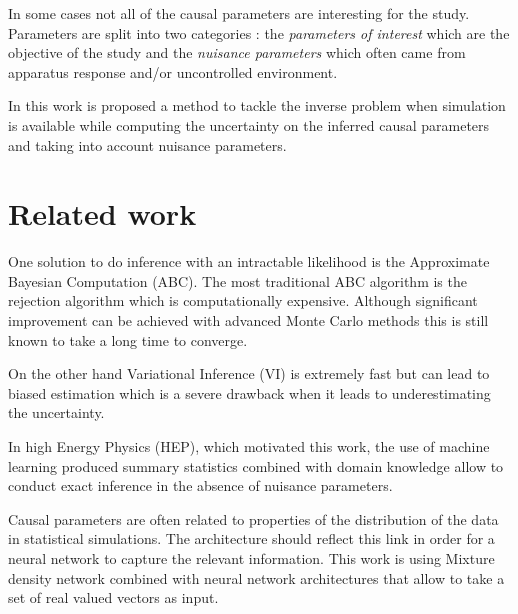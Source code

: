 In some cases not all of the causal parameters are interesting for the study.
Parameters are split into two categories : the \emph{parameters of interest} which are the objective of the study and the \emph{nuisance parameters} which often came from apparatus response and/or uncontrolled environment.

In this work is proposed a method to tackle the inverse problem when simulation is available while computing the uncertainty on the inferred causal parameters and taking into account nuisance parameters.


\section{Related work}



One solution to do inference with an intractable likelihood is the Approximate Bayesian Computation (ABC).
The most traditional ABC algorithm is the rejection algorithm which is computationally expensive.
Although significant improvement can be achieved with advanced Monte Carlo methods this is still known to take a long time to converge.

On the other hand Variational Inference (VI) is extremely fast but can lead to biased estimation which is a severe drawback when it leads to underestimating the uncertainty.

In high Energy Physics (HEP), which motivated this work, the use of machine learning produced summary statistics combined with domain knowledge allow to conduct exact inference in the absence of nuisance parameters.


Causal parameters are often related to properties of the distribution of the data in statistical simulations.
The architecture should reflect this link in order for a neural network to capture the relevant information.
This work is using Mixture density network \cite{Bishop94mixturedensity} combined with neural network architectures that allow to take a set of real valued vectors as input.

